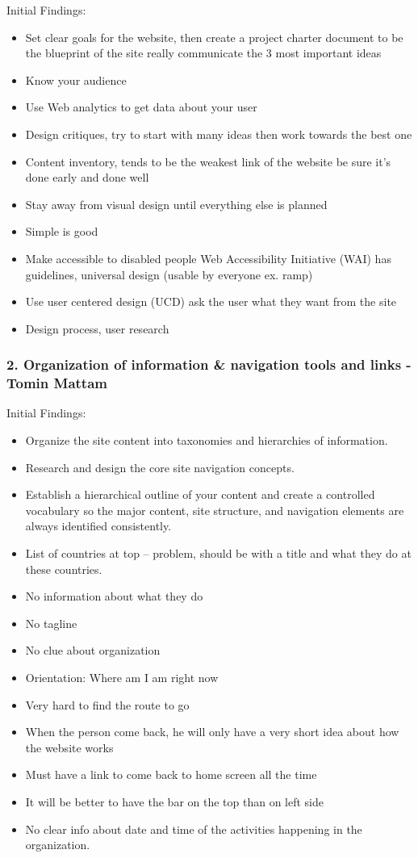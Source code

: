 \documentclass[12pt]{article}
\begin{document}
Initial Findings:
\begin{itemize}
\item Set clear goals for the website, then create a project charter document to be the blueprint of the site
really communicate the 3 most important ideas
\item Know your audience 
\item Use Web analytics to get data about your user
\item Design critiques, try to start with many ideas then work towards the best one
\item Content inventory, tends to be the weakest link of the website be sure it’s done early and done well
\item Stay away from visual design until everything else is planned
\item Simple is good

\item Make accessible to disabled people Web Accessibility Initiative (WAI) has guidelines, universal design (usable by everyone ex. ramp)
\item Use user centered design (UCD) ask the user what they want from the site
\item Design process, user research 
\end{itemize}

\subsubsection*{2. Organization of information \& navigation tools and links - Tomin Mattam}
Initial Findings:
\begin{itemize}
\item Organize the site content into taxonomies and hierarchies of information.
\item Research and design the core site navigation concepts.
\item Establish a hierarchical outline of your content and create a controlled vocabulary so the major content, site structure, and navigation elements are always identified consistently.
\item List of countries at top – problem, should be with a title and what they do at these countries.
\item No information about what they do 
\item No tagline 
\item No clue about organization
\item Orientation: Where am I am right now
\item Very hard to find the route to go 
\item When the person come back, he will only have a very short idea about how the website works 
\item Must have a link to come back to home screen all the time 

\item It will be better to have the bar on the top than on left side 
\item No clear info about date and time of the activities happening in the organization.
\end{itemize}
\end{document}
